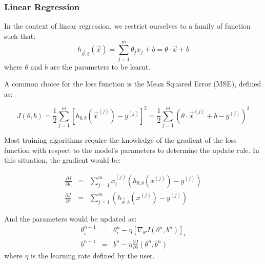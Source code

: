 \documentclass{article}
\begin{document}
\subsubsection{Linear Regression}
\label{subsubsec:linear-regression}
In the context of linear regression, we restrict ourselves to a family of function such that:
\begin{equation}
h_{\vec{\theta},b} ( \vec{x} ) = \sum_{j = 1}^{m} \theta_j x_j + b = \theta \cdot \vec{x} + b
\end{equation}
where $\theta$ and $b$ are the parameters to be learnt.

A common choice for the loss function is the Mean Squared Error (MSE), defined as:

\begin{equation}
J \left( \theta , b\right) = \frac{1}{2} \sum_{j=1}^m \left[ h_{\theta,b} \left( \vec{x}^{(j)} \right) -  y^{(j)} \right]^2 =  \frac{1}{2} \sum_{j=1}^m \left( \theta \cdot \vec{x}^{(j)} + b - y ^{(j)} \right) ^2
\label{eq:MSE-definition}
\end{equation}

Most training algorithms require the knowledge of the gradient of the loss function with respect to the model's parameters to determine the update rule. In this situation, the gradient would be:

\begin{eqnarray}
\frac{ \partial J}{\partial \theta_i } &=& \sum _{j= 1}^m x_i^{(j)} (  h_{\theta, b} ( x^{(j)}) - y^{(j)} ) \\
\frac{ \partial J}{\partial b } &=&  \sum _{j= 1}^m (  h_{\vec{\theta}, b} ( x^{(j)}) - y^{(j)} )
\label{eq:MSE-gradient}
\end{eqnarray}

And the parameters would be updated as:
\begin{eqnarray}
\theta_i^{n+1} &=& \theta_i^{n} - \eta \left[\nabla_{\theta} J(\theta^n,b^n )\right]_i \\
b^{n+1} &=& b^n - \eta \frac{\partial J}{\partial b} \left(\theta^n,b^n \right)
\label{eq:GD-update-rule}
\end{eqnarray}
where $\eta$ is the learning rate defined by the user.
\end{document}
